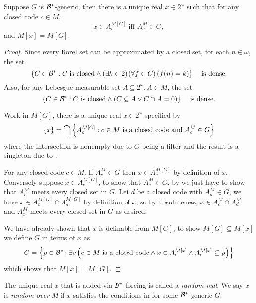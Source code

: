 \begin{theorem} \label{theorem:random_real}
    Suppose \(G\) is \({\mathcal{B}}^*\)-generic,
    then there is a unique real \(x \in 2^\omega\) such that for any closed code \(c\in M\),
    \[ x\in A_c^{M[G]} \text{ iff } A_c^M \in G, \]
    and \(M[x] = M[G]\).
\end{theorem}
\begin{proof}
    Since every Borel set can be approximated by a closed set, for each \(n\in\omega\), the set
    \begin{equation} \label{eqn:borel_algebra_dense}
        {\left\{ C\in {\mathcal{B}}^*: C\text{ is closed} \land \left(\exists k\in2\right)\left(\forall f\in C\right)\left(f(n) = k\right)  \right\}}\quad\text{ is dense.}
    \end{equation}
    Also, for any Lebesgue measurable set \(A\subseteq 2^\omega, A\in M\), the set
    \begin{equation} \label{eqn:borel_algebra_dense2}
        {\left\{ C\in {\mathcal{B}}^*: C\text{ is closed} \land \left(C\subseteq A\lor C\cap A = 0\right)  \right\}}\quad\text{ is dense.}
    \end{equation}

    Work in \(M[G]\), there is a unique real \(x\in2^\omega\) specified by
    \[ {\left\{ x \right\}} = \bigcap{\left\{ A_c^{M[G]}: c\in M \text{ is a closed code and } A_c^M\in G \right\}} \]
    where the intersection is nonempty due to \(G\) being a filter and the result is a singleton due to .

    For any closed code \(c\in M\).  If \(A_c^M\in G\) then \(x\in A_c^{M[G]}\) by definition of \(x\).
    Conversely suppose \(x\in A_c^{M[G]}\),
    to show that \(A_c^M\in G\),
    by 
    we just have to show that \(A_c^M\) meets every closed set in \(G\).
    Let \(d\) be a closed code with \(A_d^M\in G\),
    we have \(x \in A_c^{M[G]} \cap A_d^{M[G]}\) by definition of \(x\),
    so by absoluteness, \(x \in A_c^M \cap A_d^M\) and \(A_c^M\) meets every closed set in \(G\) as desired.

    We have already shown that \(x\) is definable from \(M[G]\),
    to show \(M[G]\subseteq M[x]\) we define \(G\) in terms of \(x\) as
    \[ G = {\left\{ p\in{\mathcal{B}}^* : \exists c\left(c\in M\text{ is a closed code} \land x\in A_c^{M[x]} \land A_c^{M[x]} \subseteq p\right)  \right\}} \]
    which shows that \(M[x] = M[G]\).
\end{proof}

\begin{definition}
    The unique real \(x\) that is added via \({\mathcal{B}}^*\)-forcing is called a \emph{random real}.
    We say \(x\) is \emph{random over} \(M\) if \(x\) satisfies the conditions in 
    for some \({\mathcal{B}}^*\)-generic \(G\).
\end{definition}

